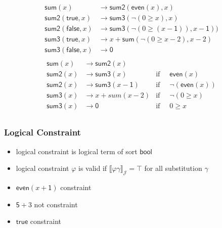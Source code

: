 \documentclass[12pt,aspectratio=169]{beamer}
\newcommand{\m}[1]{\mathsf{#1}}
\newcommand{\JJ}{\mathcal{J}}
\begin{document}
\begin{frame}
        \begin{align*}
        \m{sum}(x) &\to \m{sum2}(\m{even}(x),x) \\
        \m{sum2}(\m{true}, x) &\to \m{sum3}(\neg(0 \geq x), x) \\
        \m{sum2}(\m{false}, x) &\to \m{sum3}(\neg(0 \geq (x-\m{1})), x - \m{1}))\\
        \m{sum3}(\m{true}, x) &\to x + \m{sum}(\neg(0 \geq x-2), x-2) \\
        \m{sum3}(\m{false},x) &\to \m{0}\\
        \end{align*}
        \pause
        \vspace{-10mm}
        \begin{align*}
            \m{sum}(x) &\to \m{sum2}(x) &\\
            \m{sum2}(x) &\to \m{sum3}(x) & \text{if} & \;\; \m{even}(x)\\
            \m{sum2}(x) &\to \m{sum3}(x-\m{1}) & \text{if} & \;\; \neg(\m{even}(x))\\
            \m{sum3}(x) &\to x + {sum}(x-2) & \text{if} & \;\; \neg(0 \geq x)  \\
            \m{sum3}(x) &\to \m{0} & \text{if} & \;\;0 \geq x \\
        \end{align*}
\end{frame}

\begin{frame}
    \frametitle{Logical Constraint}
    \begin{definition}
        \begin{itemize}
            \item \alert{logical constraint} is logical term of sort \alert{$\m{bool}$} %
                \pause
        \item logical constraint $\varphi$ is \alert{valid} if $\llbracket \varphi\gamma \rrbracket_\JJ = \top$ for all substitution $\gamma$
        \end{itemize}
    \end{definition}
    \pause
    \begin{example}
        \begin{itemize}[<+->]
            \item $\m{even}(x + \m{1})$ \quad \pause \alert{constraint}
            \item $\m{5} + {3}$ \quad \pause \alert{not constraint}
            \item $\m{true}$ \quad \pause \alert{constraint}
        \end{itemize}
    \end{example}
\end{frame}
\end{document}
